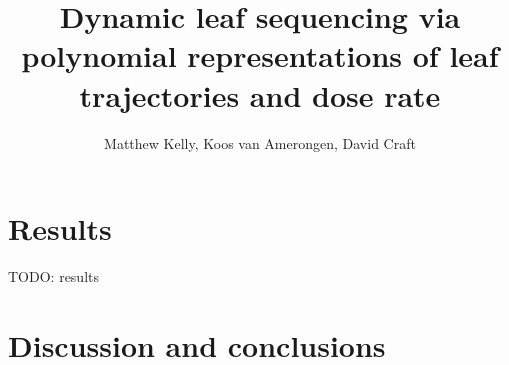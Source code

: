 

\title{Dynamic leaf sequencing via polynomial representations of leaf trajectories and dose rate}

\author{Matthew Kelly, Koos van Amerongen, David Craft}



\maketitle
\thispagestyle{empty}







\section{Results}

TODO:  results

\section{Discussion and conclusions}





